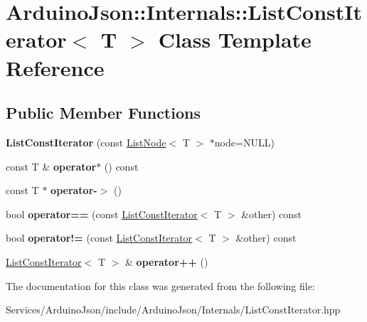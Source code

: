 \hypertarget{class_arduino_json_1_1_internals_1_1_list_const_iterator}{}\section{Arduino\+Json\+:\+:Internals\+:\+:List\+Const\+Iterator$<$ T $>$ Class Template Reference}
\label{class_arduino_json_1_1_internals_1_1_list_const_iterator}
\subsection*{Public Member Functions}
\begin{DoxyCompactItemize}
\item 
\hypertarget{class_arduino_json_1_1_internals_1_1_list_const_iterator_ac809f94e5605ba8448e233ac6eb07575}{}{\bfseries List\+Const\+Iterator} (const \hyperlink{struct_arduino_json_1_1_internals_1_1_list_node}{List\+Node}$<$ T $>$ $\ast$node=N\+U\+L\+L)\label{class_arduino_json_1_1_internals_1_1_list_const_iterator_ac809f94e5605ba8448e233ac6eb07575}

\item 
\hypertarget{class_arduino_json_1_1_internals_1_1_list_const_iterator_a8ad8ddbcebb48dc93002eb52213d9035}{}const T \& {\bfseries operator$\ast$} () const \label{class_arduino_json_1_1_internals_1_1_list_const_iterator_a8ad8ddbcebb48dc93002eb52213d9035}

\item 
\hypertarget{class_arduino_json_1_1_internals_1_1_list_const_iterator_a402ffcb21574268972ab1212f377ce85}{}const T $\ast$ {\bfseries operator-\/$>$} ()\label{class_arduino_json_1_1_internals_1_1_list_const_iterator_a402ffcb21574268972ab1212f377ce85}

\item 
\hypertarget{class_arduino_json_1_1_internals_1_1_list_const_iterator_aefeb061c6636cb38fca6dad11bbaa998}{}bool {\bfseries operator==} (const \hyperlink{class_arduino_json_1_1_internals_1_1_list_const_iterator}{List\+Const\+Iterator}$<$ T $>$ \&other) const \label{class_arduino_json_1_1_internals_1_1_list_const_iterator_aefeb061c6636cb38fca6dad11bbaa998}

\item 
\hypertarget{class_arduino_json_1_1_internals_1_1_list_const_iterator_ab5f708a096b6a440d206cebd26df9552}{}bool {\bfseries operator!=} (const \hyperlink{class_arduino_json_1_1_internals_1_1_list_const_iterator}{List\+Const\+Iterator}$<$ T $>$ \&other) const \label{class_arduino_json_1_1_internals_1_1_list_const_iterator_ab5f708a096b6a440d206cebd26df9552}

\item 
\hypertarget{class_arduino_json_1_1_internals_1_1_list_const_iterator_a224941fb91e378484c344012218e946f}{}\hyperlink{class_arduino_json_1_1_internals_1_1_list_const_iterator}{List\+Const\+Iterator}$<$ T $>$ \& {\bfseries operator++} ()\label{class_arduino_json_1_1_internals_1_1_list_const_iterator_a224941fb91e378484c344012218e946f}

\end{DoxyCompactItemize}


The documentation for this class was generated from the following file\+:\begin{DoxyCompactItemize}
\item 
Services/\+Arduino\+Json/include/\+Arduino\+Json/\+Internals/List\+Const\+Iterator.\+hpp\end{DoxyCompactItemize}

